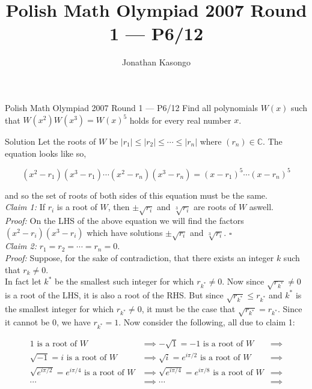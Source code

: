 \documentclass{article}
\author{Jonathan Kasongo}
\title{Polish Math Olympiad 2007 Round 1 --- P6/12}
\begin{document}
\maketitle

\begin{problem}{Polish Math Olympiad 2007 Round 1 --- P6/12}
Find all polynomials $W(x)$ such that $W\left(x^2\right) W\left(x^3\right)
= W(x)^5$ holds for every real number $x$.
\end{problem}

\begin{solution}{Solution}
Let the roots of $W$ be $|r_1| \leq |r_2| \leq \cdots \leq |r_n|$ where
$(r_n) \in \mathbb{C}$. The equation looks like so,

$$
\left(x^2 - r_1\right)\left(x^3 - r_1\right)\cdots
\left(x^2 - r_n\right)\left(x^3 - r_n\right)
=
(x - r_1)^5\cdots(x - r_n)^5
$$

and so the set of roots of both sides of this equation must be the same.\\

\textit{Claim 1:} If $r_i$ is a root of $W$, then $\pm \sqrt{r_i}$ and
$\sqrt[3]{r_i}$ are roots of $W$ aswell.\\

\textit{Proof:} On the LHS of the above equation we will find the factors
$\left(x^2 - r_i\right)\left(x^3 - r_i\right)$ which have solutions
$\pm \sqrt{r_i}$ and $\sqrt[3]{r_i}$. $\square$\\

\textit{Claim 2:} $r_1 = r_2 = \cdots = r_n = 0$. \\

\textit{Proof:}
Suppose, for the sake of contradiction, that there exists
an integer $k$ such that $r_k \neq 0$. \\

In fact let $k^{*}$ be the
smallest such integer for which $r_{k^{*}} \neq 0$. Now since
$\sqrt{r_{k^{*}}} \neq 0$ is a root of the LHS, it is also a root of the
RHS. But since $\sqrt{r_{k^{*}}} \leq r_{k^{*}}$ and $k^{*}$ is the smallest
integer for which $r_{k^{*}} \neq 0$, it must be the case that
$\sqrt{r_{k^{*}}} = r_{k^{*}}$. Since it cannot be 0, we have
$r_{k^{*}} = 1$. Now consider the following, all due to claim 1:

\[
\begin{aligned}
1 \text{ is a root of } W &\implies
-\sqrt{1} = -1 \text{ is a root of } W &\implies \\
\sqrt{-1} = i \text{ is a root of } W &\implies
\sqrt{i} = e^{i\pi/2} \text{ is a root of } W &\implies \\
\sqrt{e^{i\pi/2}} = e^{i\pi/4} \text{ is a root of } W &\implies
\sqrt{e^{i\pi/4}} = e^{i\pi/8} \text{ is a root of } W &\implies \\
\cdots &\implies \cdots &\implies
\end{aligned}
\]


\end{solution}
\end{document}
